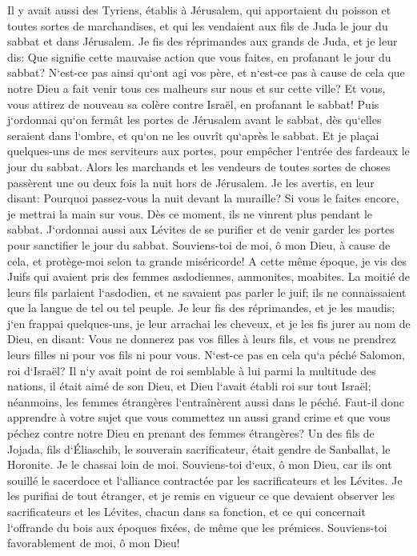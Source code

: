 \verse Il y avait aussi des Tyriens, établis à Jérusalem, qui apportaient du poisson et toutes sortes de marchandises, et qui les vendaient aux fils de Juda le jour du sabbat et dans Jérusalem. 
\verse Je fis des réprimandes aux grands de Juda, et je leur dis: Que signifie cette mauvaise action que vous faites, en profanant le jour du sabbat? 
\verse N`est-ce pas ainsi qu`ont agi vos père, et n`est-ce pas à cause de cela que notre Dieu a fait venir tous ces malheurs sur nous et sur cette ville? Et vous, vous attirez de nouveau sa colère contre Israël, en profanant le sabbat! 
\verse Puis j`ordonnai qu`on fermât les portes de Jérusalem avant le sabbat, dès qu`elles seraient dans l`ombre, et qu`on ne les ouvrît qu`après le sabbat. Et je plaçai quelques-uns de mes serviteurs aux portes, pour empêcher l`entrée des fardeaux le jour du sabbat. 
\verse Alors les marchands et les vendeurs de toutes sortes de choses passèrent une ou deux fois la nuit hors de Jérusalem. 
\verse Je les avertis, en leur disant: Pourquoi passez-vous la nuit devant la muraille? Si vous le faites encore, je mettrai la main sur vous. Dès ce moment, ils ne vinrent plus pendant le sabbat. 
\verse J`ordonnai aussi aux Lévites de se purifier et de venir garder les portes pour sanctifier le jour du sabbat. Souviens-toi de moi, ô mon Dieu, à cause de cela, et protège-moi selon ta grande miséricorde! 
\verse A cette même époque, je vis des Juifs qui avaient pris des femmes asdodiennes, ammonites, moabites. 
\verse La moitié de leurs fils parlaient l`asdodien, et ne savaient pas parler le juif; ils ne connaissaient que la langue de tel ou tel peuple. 
\verse Je leur fis des réprimandes, et je les maudis; j`en frappai quelques-uns, je leur arrachai les cheveux, et je les fis jurer au nom de Dieu, en disant: Vous ne donnerez pas vos filles à leurs fils, et vous ne prendrez leurs filles ni pour vos fils ni pour vous. 
\verse N`est-ce pas en cela qu`a péché Salomon, roi d`Israël? Il n`y avait point de roi semblable à lui parmi la multitude des nations, il était aimé de son Dieu, et Dieu l`avait établi roi sur tout Israël; néanmoins, les femmes étrangères l`entraînèrent aussi dans le péché. 
\verse Faut-il donc apprendre à votre sujet que vous commettez un aussi grand crime et que vous péchez contre notre Dieu en prenant des femmes étrangères? 
\verse Un des fils de Jojada, fils d`Éliaschib, le souverain sacrificateur, était gendre de Sanballat, le Horonite. Je le chassai loin de moi. 
\verse Souviens-toi d`eux, ô mon Dieu, car ils ont souillé le sacerdoce et l`alliance contractée par les sacrificateurs et les Lévites. 
\verse Je les purifiai de tout étranger, et je remis en vigueur ce que devaient observer les sacrificateurs et les Lévites, chacun dans sa fonction, 
\verse et ce qui concernait l`offrande du bois aux époques fixées, de même que les prémices. Souviens-toi favorablement de moi, ô mon Dieu! 
